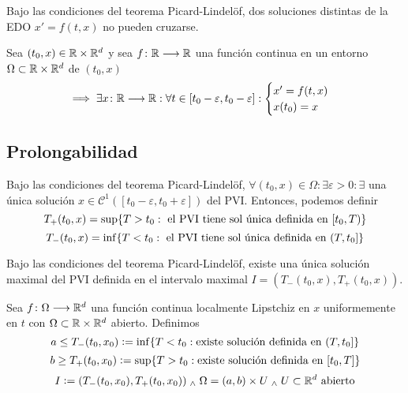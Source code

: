
\begin{cor}
	Bajo las condiciones del teorema Picard-Lindelöf, dos soluciones distintas de la EDO $x'=f(t,x)$ no pueden cruzarse.
\end{cor}

\begin{teo}
	Sea $(t_0, x) \in \mathbb{R}\times\mathbb{R}^d$ y sea $f \colon \mathbb{R} \longrightarrow \mathbb{R}$ una función continua en un entorno $\Omega \subset \mathbb{R}\times\mathbb{R}^d$ de $(t_0, x)$
	\[\implies \exists x \colon \mathbb{R} \longrightarrow \mathbb{R} : \forall t \in [t_0 - \varepsilon, t_0 - \varepsilon] : \begin{cases}
			x' = f(t, x) \\
			x(t_0) = x
		\end{cases}\]
\end{teo}

\subsection{Prolongabilidad}

Bajo las condiciones del teorema Picard-Lindelöf, $\forall (t_0, x) \in \Omega : \exists \varepsilon > 0 : \exists $ una única solución $x \in \mathcal{C}^1([t_0-\varepsilon, t_0+\varepsilon])$ del PVI. Entonces, podemos definir
\[T_+(t_0, x) = \sup\{T > t_0 : \text{ el PVI tiene sol única definida en } [t_0, T)\}\]
\[T_-(t_0, x) = \inf\{T < t_0 : \text{ el PVI tiene sol única definida en } (T, t_0]\}\]

\begin{teo}
	Bajo las condiciones del teorema Picard-Lindelöf, existe una única solución maximal del PVI definida en el intervalo maximal $I = (T_-(t_0, x), T_+(t_0, x))$.
\end{teo}

Sea $f \colon \Omega \longrightarrow \mathbb{R}^d$ una función continua localmente Lipstchiz en $x$ uniformemente en $t$ con $\Omega\subset \mathbb{R}\times\mathbb{R}^d$ abierto. Definimos
\[a \leq T_-(t_0, x_0) \vcentcolon= \inf\{T < t_0: \text{existe solución definida en }(T, t_0]\}\]
\[b \geq T_+(t_0, x_0) \vcentcolon= \sup\{T > t_0: \text{existe solución definida en }[t_0, T]\}\]
\[I\vcentcolon= (T_-(t_0, x_0), T_+(t_0, x_0)) \; _{\wedge} \; \Omega = (a, b)\times U \; _{\wedge} \; U\subset \mathbb{R}^d \text{ abierto}\]

